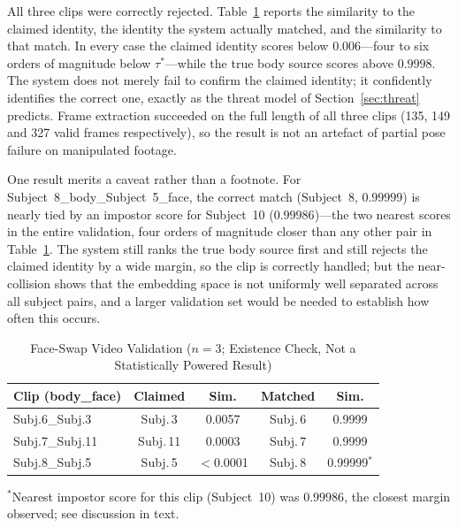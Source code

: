 \documentclass[journal]{IEEEtran}
\newcommand{\tabhead}[1]{\textbf{#1}}
\begin{document}
All three clips were correctly rejected. Table~\ref{tab:deepfake-video} reports
the similarity to the claimed identity, the identity the system actually
matched, and the similarity to that match. In every case the claimed identity
scores below $0.006$---four to six orders of magnitude below
$\tau^*$---while the true body source scores above $0.9998$. The system does
not merely fail to confirm the claimed identity; it confidently identifies the
correct one, exactly as the threat model of Section~\ref{sec:threat} predicts.
Frame extraction succeeded on the full length of all three clips (135, 149 and
327 valid frames respectively), so the result is not an artefact of partial
pose failure on manipulated footage.

One result merits a caveat rather than a footnote. For
Subject~8\_body\_Subject~5\_face, the correct match (Subject~8, $0.99999$) is
nearly tied by an impostor score for Subject~10 ($0.99986$)---the two
nearest scores in the entire validation, four orders of magnitude closer than
any other pair in Table~\ref{tab:deepfake-video}. The system still ranks the
true body source first and still rejects the claimed identity by a wide margin,
so the clip is correctly handled; but the near-collision shows that the
embedding space is not uniformly well separated across all subject pairs, and
a larger validation set would be needed to establish how often this occurs.

\begin{table}[!t]
\caption{Face-Swap Video Validation ($n=3$; Existence Check, Not a
Statistically Powered Result)}
\label{tab:deepfake-video}
\centering
\small
\begin{tabular}{@{}lcccc@{}}
\toprule
\tabhead{Clip (body\_face)} & \tabhead{Claimed} & \tabhead{Sim.} &
\tabhead{Matched} & \tabhead{Sim.} \\
\midrule
Subj.6\_Subj.3 & Subj.\,3 & 0.0057 & Subj.\,6 & 0.9999 \\
Subj.7\_Subj.11 & Subj.\,11 & 0.0003 & Subj.\,7 & 0.9999 \\
Subj.8\_Subj.5  & Subj.\,5 & $<$0.0001 & Subj.\,8 & 0.99999$^{\ast}$ \\
\bottomrule
\end{tabular}

\vspace{2pt}
\raggedright\footnotesize
$^{\ast}$Nearest impostor score for this clip (Subject~10) was $0.99986$,
the closest margin observed; see discussion in text.
\end{table}
\end{document}

